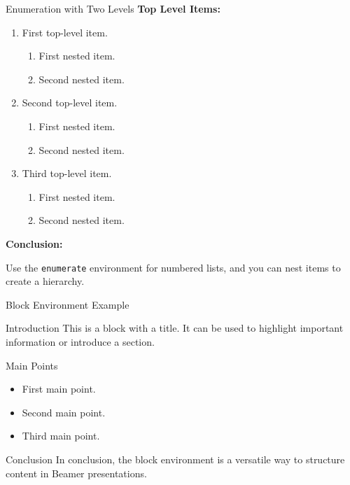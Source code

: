 \documentclass[aspectratio=169]{beamer}
\begin{document}
\begin{frame}{Enumeration with Two Levels}
  \textbf{Top Level Items:}

  \begin{enumerate}
    \item First top-level item.
      \begin{enumerate}
        \item First nested item.
        \item Second nested item.
      \end{enumerate}
    \item Second top-level item.
      \begin{enumerate}
        \item First nested item.
        \item Second nested item.
      \end{enumerate}
    \item Third top-level item.
      \begin{enumerate}
        \item First nested item.
        \item Second nested item.
      \end{enumerate}
  \end{enumerate}

  \textbf{Conclusion:}

  Use the \texttt{enumerate} environment for numbered lists, and you can nest items to create a hierarchy.
\end{frame}

\begin{frame}{Block Environment Example}
  \begin{block}{Introduction}
    This is a block with a title. It can be used to highlight important information or introduce a section.
  \end{block}

  \begin{block}{Main Points}
    \begin{itemize}
      \item First main point.
      \item Second main point.
      \item Third main point.
    \end{itemize}
  \end{block}

  \begin{block}{Conclusion}
    In conclusion, the block environment is a versatile way to structure content in Beamer presentations.
  \end{block}
\end{frame}
\end{document}
